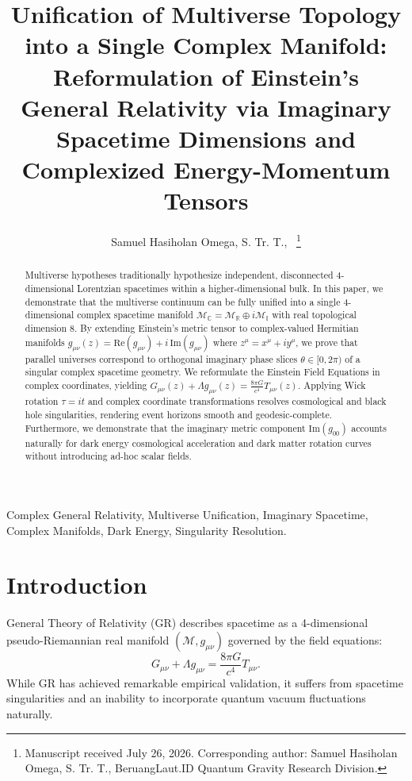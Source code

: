 \documentclass[journal,twocolumn]{IEEEtran}
\title{Unification of Multiverse Topology into a Single Complex Manifold: Reformulation of Einstein's General Relativity via Imaginary Spacetime Dimensions and Complexized Energy-Momentum Tensors}
\author{
  Samuel Hasiholan Omega, S. Tr. T.,~\IEEEmembership{Member,~IEEE}
  \thanks{Manuscript received July 26, 2026. Corresponding author: Samuel Hasiholan Omega, S. Tr. T., BeruangLaut.ID Quantum Gravity Research Division.}}
\begin{document}
\maketitle

\begin{abstract}
Multiverse hypotheses traditionally hypothesize independent, disconnected 4-dimensional Lorentzian spacetimes within a higher-dimensional bulk. In this paper, we demonstrate that the multiverse continuum can be fully unified into a single 4-dimensional complex spacetime manifold $\mathcal{M}_{\mathbb{C}} = \mathcal{M}_{\mathbb{R}} \oplus i \mathcal{M}_{\mathbb{I}}$ with real topological dimension 8. By extending Einstein's metric tensor to complex-valued Hermitian manifolds $g_{\mu\nu}(z) = \text{Re}(g_{\mu\nu}) + i \, \text{Im}(g_{\mu\nu})$ where $z^\mu = x^\mu + i y^\mu$, we prove that parallel universes correspond to orthogonal imaginary phase slices $\theta \in [0, 2\pi)$ of a singular complex spacetime geometry. We reformulate the Einstein Field Equations in complex coordinates, yielding $G_{\mu\nu}(z) + \Lambda g_{\mu\nu}(z) = \frac{8\pi G}{c^4} T_{\mu\nu}(z)$. Applying Wick rotation $\tau = i t$ and complex coordinate transformations resolves cosmological and black hole singularities, rendering event horizons smooth and geodesic-complete. Furthermore, we demonstrate that the imaginary metric component $\text{Im}(g_{00})$ accounts naturally for dark energy cosmological acceleration and dark matter rotation curves without introducing ad-hoc scalar fields.
\end{abstract}

\begin{IEEEkeywords}
Complex General Relativity, Multiverse Unification, Imaginary Spacetime, Complex Manifolds, Dark Energy, Singularity Resolution.
\end{IEEEkeywords}

\section{Introduction}
 General Theory of Relativity (GR) describes spacetime as a 4-dimensional pseudo-Riemannian real manifold $(\mathcal{M}, g_{\mu\nu})$ governed by the field equations:
\begin{equation}
G_{\mu\nu} + \Lambda g_{\mu\nu} = \frac{8\pi G}{c^4} T_{\mu\nu}.
\end{equation}
While GR has achieved remarkable empirical validation, it suffers from spacetime singularities and an inability to incorporate quantum vacuum fluctuations naturally.
\end{document}
